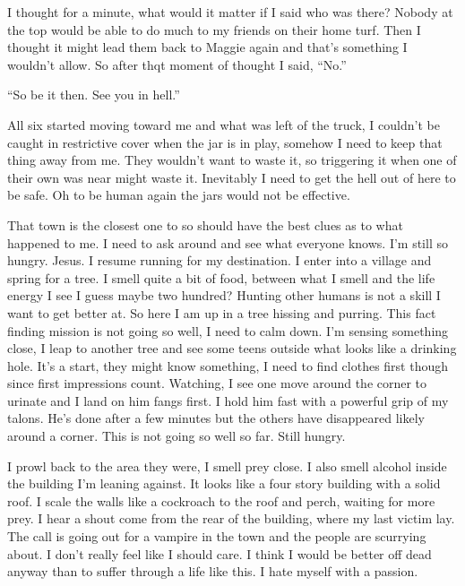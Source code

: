 I thought for a minute, what would it matter if I said who was there? Nobody at the top would be able to do much to my friends on their home turf. Then I thought it might lead them back to Maggie again and that's something I wouldn't allow. So after thqt moment of thought I said, ``No.''

``So be it then. See you in hell.''

All six started moving toward me and what was left of the truck, I couldn't be caught in restrictive cover when the jar is in play, somehow I need to keep that thing away from me. They wouldn't want to waste it, so triggering it when one of their own was near might waste it. Inevitably I need to get the hell out of here to be safe. Oh to be human again the jars would not be effective.






That town is the closest one to \chichenitza so should have the best clues as to what happened to me. I need to ask around and see what everyone knows. I'm still so  hungry. Jesus. I resume running for my destination. I enter into a village and spring for a tree. I smell quite a bit of food, between what I smell and the life energy I see I guess maybe two hundred? Hunting other humans is not a skill I want to get better at. So here I am up in a tree hissing and purring. This fact finding mission is not going so well, I need to calm down. I'm sensing something close, I leap to another tree and see some teens outside what looks like a drinking hole. It's a start, they might know something, I need to find clothes first though since first impressions count. Watching, I see one move around the corner to urinate and I land on him fangs first. I hold him fast with a powerful grip of my talons. He's done after a few minutes but the others have disappeared likely around a corner. This is not going so well so far. Still hungry. 

I prowl back to the area they were, I smell prey close. I also smell alcohol inside the building I'm leaning against. It looks like a four story building with a solid roof. I scale the walls like a cockroach to the roof and perch, waiting for more prey. I hear a shout come from the rear of the building, where my last victim lay. The call is going out for a vampire in the town and the people are scurrying about. I don't really feel like I should care. I think I would be better off dead anyway than to suffer through a life like this. I hate myself with a passion. 

